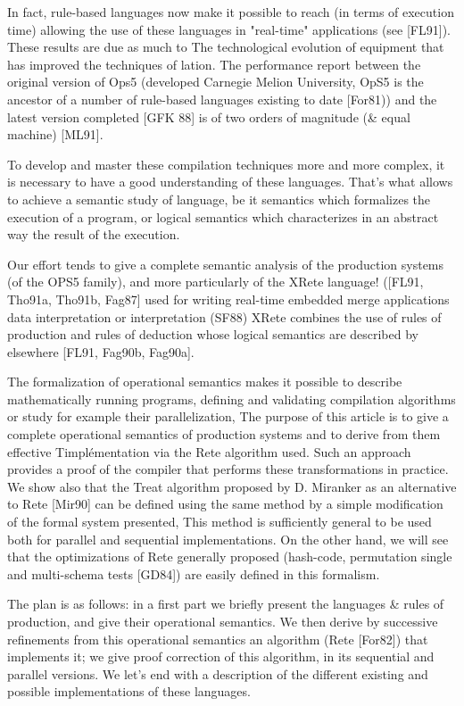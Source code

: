 In fact, rule-based languages now make it possible to reach
(in terms of execution time) allowing the use of these languages
in "real-time" applications (see [FL91]). These results are due as much to
The technological evolution of equipment that has improved the techniques of
lation. The performance report between the original version of Ops5 (developed
Carnegie Melion University, OpS5 is the ancestor of a number of rule-based languages
existing to date [For81)) and the latest version completed [GFK 88] is of two orders 
of magnitude (\& equal machine) [ML91].

To develop and master these compilation techniques more and more
complex, it is necessary to have a good understanding of these languages. That's what
allows to achieve a semantic study of language, be it semantics
which formalizes the execution of a program, or logical semantics
which characterizes in an abstract way the result of the execution.

Our effort tends to give a complete semantic analysis of the production systems
(of the OPS5 family), and more particularly of the XRete language! ([FL91, Tho91a,
Tho91b, Fag87] used for writing real-time embedded merge applications
data interpretation or interpretation (SF88) XRete combines the use of rules
of production and rules of deduction whose logical semantics are described by
elsewhere [FL91, Fag90b, Fag90a].

The formalization of operational semantics makes it possible to describe mathematically
running programs, defining and validating compilation algorithms
or study for example their parallelization, The purpose of this article is to give
a complete operational semantics of production systems and to derive from them
effective Timplémentation via the Rete algorithm used. Such an approach provides
a proof of the compiler that performs these transformations in practice. We show
also that the Treat algorithm proposed by D. Miranker as an alternative to
Rete [Mir90] can be defined using the same method by a simple modification
of the formal system presented, This method is sufficiently general to be used
both for parallel and sequential implementations. On the other hand, we
will see that the optimizations of Rete generally proposed (hash-code, permutation
single and multi-schema tests [GD84]) are easily defined in this formalism.

The plan is as follows: in a first part we briefly present the
languages \& rules of production, and give their operational semantics.
We then derive by successive refinements from this operational semantics
an algorithm (Rete [For82]) that implements it; we give proof
correction of this algorithm, in its sequential and parallel versions. We
let's end with a description of the different existing and possible implementations
of these languages.

